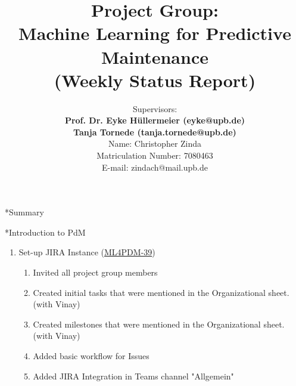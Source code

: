 \documentclass[11pt,a4paper]{article}
\title{Project Group:\\
\textbf{Machine Learning for Predictive Maintenance}\\
(Weekly Status Report)}
\author{Supervisors:\\
\textbf{Prof. Dr. Eyke H{\"u}llermeier (eyke@upb.de)}\\
\textbf{Tanja Tornede (tanja.tornede@upb.de)}\\ 
\vspace{10mm}
Name: Christopher Zinda \\
Matriculation Number: 7080463\\
E-mail: zindach@mail.upb.de
}
\date{}
\begin{document}
\maketitle
\thispagestyle{empty}

\clearpage
{}

\newpage
\begin{section}*{Summary}

 \begin{subsection}*{Introduction to PdM}
   \begin{enumerate}
     \item
           Set-up JIRA Instance (\href{https://ml4pdm.atlassian.net/browse/ML4PDM-39}{ML4PDM-39})
           \begin{enumerate}
             \item
                   Invited all project group members
             \item
                   Created initial tasks that were mentioned in the Organizational sheet. (with Vinay)
             \item
                   Created milestones that were mentioned in the Organizational sheet. (with Vinay)
             \item
                   Added basic workflow for Issues
             \item
                   Added JIRA Integration in Teams channel "Allgemein"


\end{enumerate}
\end{enumerate}
\end{subsection}
\end{section}
\end{document}
